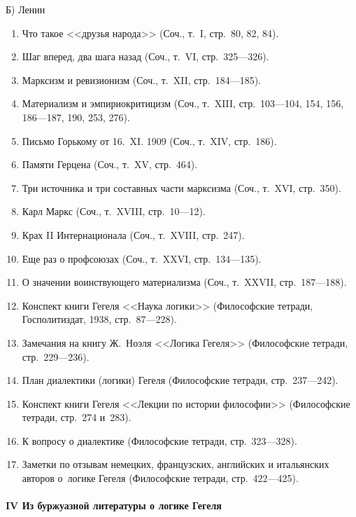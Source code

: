 {\centering Б) Ленин \par}

\begin{enumerate}
\item Что такое <<друзья народа>> (Соч., т.~I, стр.~80, 82, 84).
\item Шаг вперед, два шага назад (Соч., т.~VI, стр.~325---326).
\item Марксизм и ревизионизм (Соч., т.~XII, стр.~184---185).
\item Материализм и эмпириокритицизм (Соч., т.~XIII, стр.~103---104, 154, 156,
186---187, 190, 253, 276).
\item Письмо Горькому от 16.~XI. 1909 (Соч., т.~XIV, стр.~186).
\item Памяти Герцена (Соч., т.~XV, стр.~464).
\item Три источника и три составных части марксизма (Соч., т.~XVI, стр.~350).
\item Карл Маркс (Соч., т.~XVIII, стр.~10---12).
\item Крах II Интернационала (Соч., т.~XVIII, стр.~247).
\item Еще раз о профсоюзах (Соч., т.~XXVI, стр.~134---135).
\item О значении воинствующего материализма (Соч., т.~XXVII, стр.~187---188).
\item Конспект книги Гегеля <<Наука логики>> (Философские тетради,
Госполитиздат, 1938, стр.~87---228).
\item Замечания на книгу Ж.~Ноэля <<Логика Гегеля>> (Философские тетради,
стр.~229---236).
\item План диалектики (логики) Гегеля (Философские тетради, стр.~237---242).
\item Конспект книги Гегеля <<Лекции по истории философии>>
(Философские тетради, стр.~274 и~283).
\item К вопросу о диалектике (Философские тетради, стр.~323---328).
\item Заметки по отзывам немецких, французских, английских и итальянских
авторов о~логике Гегеля (Философские тетради, стр.~422---425).
\end{enumerate}

\paragraph%
[IV Из буржуазной литературы о логике Гегеля]%
{IV Из буржуазной литературы о логике Гегеля}

